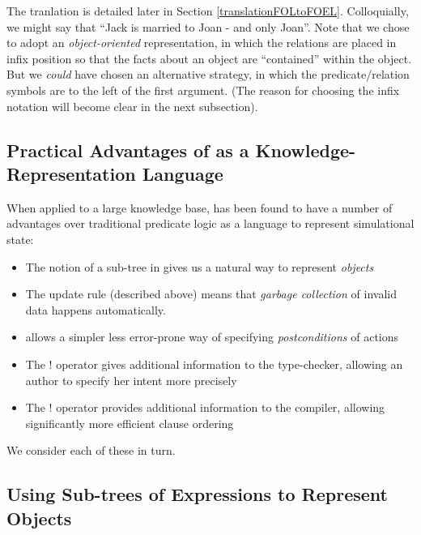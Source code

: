 \NI The tranlation is detailed later in Section
\ref{translationFOLtoFOEL}.  Colloquially, we might say that ``Jack is
married to Joan - and only Joan''.  Note that we chose to adopt an
\emph{object-oriented} representation, in which the relations are
placed in infix position so that the facts about an object are
``contained'' within the object.    But we \emph{could}
have chosen an alternative strategy, in which the predicate/relation
symbols are to the left of the first argument. (The reason for
choosing the infix notation will become clear in the next subsection).

\subsection{Practical Advantages of \ELABR{} as a Knowledge-Representation Language}

\NI When applied to a large knowledge base, \ELFULL{} has been found
to have a number of advantages over traditional predicate logic as a
language to represent simulational state:
\begin{itemize}

\item The notion of a sub-tree in \ELABR{} gives us a natural way to
  represent \emph{objects}

\item The update rule (described above) means that \emph{garbage
  collection} of invalid data happens
  automatically.

\item \ELABR{} allows a simpler less error-prone way of specifying
  \emph{postconditions} of actions

\item The $!$ operator gives additional information to the type-checker,
allowing an author to specify her intent more precisely

\item The $!$ operator provides additional information to the
  compiler, allowing significantly more efficient clause ordering

\end{itemize}
We consider  each of these in turn.

\subsection{Using Sub-trees of Expressions to Represent Objects}

